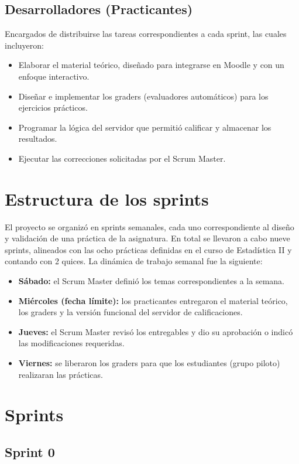 \documentclass[letter,oneside,12pt,spanish]{report}
\begin{document}
\subsection*{Desarrolladores (Practicantes)}
Encargados de distribuirse las tareas correspondientes a cada sprint, las cuales incluyeron:
\begin{itemize}[leftmargin=*]
	\item Elaborar el material teórico, diseñado para integrarse en Moodle y con un enfoque interactivo.
	\item Diseñar e implementar los graders (evaluadores automáticos) para los ejercicios prácticos.
	\item Programar la lógica del servidor que permitió calificar y almacenar los resultados.
	\item Ejecutar las correcciones solicitadas por el Scrum Master.
\end{itemize}

\section{Estructura de los sprints}

El proyecto se organizó en sprints semanales, cada uno correspondiente al diseño y validación de una práctica de la asignatura. En total se llevaron a cabo nueve sprints, alineados con las ocho prácticas definidas en el curso de Estadística II y contando con 2 quices. La dinámica de trabajo semanal fue la siguiente:

\begin{itemize}
	\item \textbf{Sábado:} el Scrum Master definió los temas correspondientes a la semana.  
	\item \textbf{Miércoles (fecha límite):} los practicantes entregaron el material teórico, los graders y la versión funcional del servidor de calificaciones.  
	\item \textbf{Jueves:} el Scrum Master revisó los entregables y dio su aprobación o indicó las modificaciones requeridas.  
	\item \textbf{Viernes:} se liberaron los graders para que los estudiantes (grupo piloto) realizaran las prácticas.  
\end{itemize}

\section{Sprints}

\subsection{Sprint 0}
\end{document}
